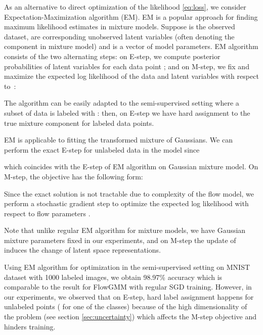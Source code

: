 \documentclass{article}
\newcommand{\method}{FlowGMM\xspace}
\begin{document}
As an alternative to direct optimization of the likelihood \eqref{eq:loss}, we consider Expectation-Maximization algorithm (EM). EM is a popular approach for finding maximum likelihood estimates in mixture models. Suppose  is the observed dataset,  are corresponding unobserved latent variables (often denoting the component in mixture model) and  is a vector of model parameters. EM algorithm consists of the two alternating steps: on E-step, we compute posterior probabilities of latent variables for each data point
;
and on M-step, we fix  and maximize the expected log likelihood of the data and latent variables with respect to~:

The algorithm can be easily adapted to the semi-supervised setting where a subset of data is labeled with : then, on E-step we have hard assignment to the true mixture component  for labeled data points.

EM is applicable to fitting the transformed mixture of Gaussians.
We can perform the exact E-step for unlabeled data in the model since

which coincides with the E-step of EM algorithm on Gaussian mixture model.
On M-step, the objective has the following form:

Since the exact solution is not tractable due to complexity of the flow model, we perform a stochastic gradient step to optimize the expected log likelihood with respect to flow parameters .

Note that unlike regular EM algorithm for mixture models, we have Gaussian mixture parameters  fixed in our experiments, and on M-step the update of  induces the change of  latent space representations.

Using EM algorithm for optimization in the semi-supervised setting on MNIST dataset with 1000 labeled images, we obtain 98.97\% accuracy which is comparable to the result for \method with regular SGD training. However, in our experiments, we observed that on E-step, hard label assignment happens for unlabeled points ( for one of the classes) because of the high dimensionality of the problem (see section \ref{sec:uncertainty}) which affects the M-step objective and hinders training.
\end{document}
